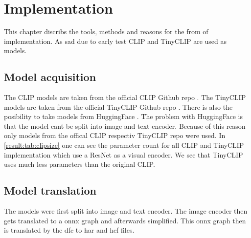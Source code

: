 \chapter{Implementation
    \label{chapter:implementation}}

This chapter discribs the tools, methods and reasons for the from of implementation.
As sad due to early test CLIP and TinyCLIP are used as models.

\section{Model acquisition}

The CLIP models are taken from the official CLIP Github repo \cite{clipgit}.
The TinyCLIP models are taken from the official TinyCLIP Github repo \cite{tinyclipgit}.
There is also the posibility to take models from HuggingFace \cite{huggingface}.
The problem with HuggingFace is that the model cant be split into image and text encoder.
Because of this reason only models from the offical CLIP respectiv TinyCLIP repo were used.
In \cref{result:tab:clipsize} one can see the parameter count for all CLIP and TinyCLIP implementation which use a ResNet as a visual encoder.
We see that TinyCLIP uses much less parameters than the original CLIP.


\section{Model translation}
The models were first split into image and text encoder.
The image encoder then gets translated to a onnx graph and afterwards simplified.
This onnx graph then is translated by the \acrshort{dfc} to \acrshort{har} and \acrshort{hef} files.

